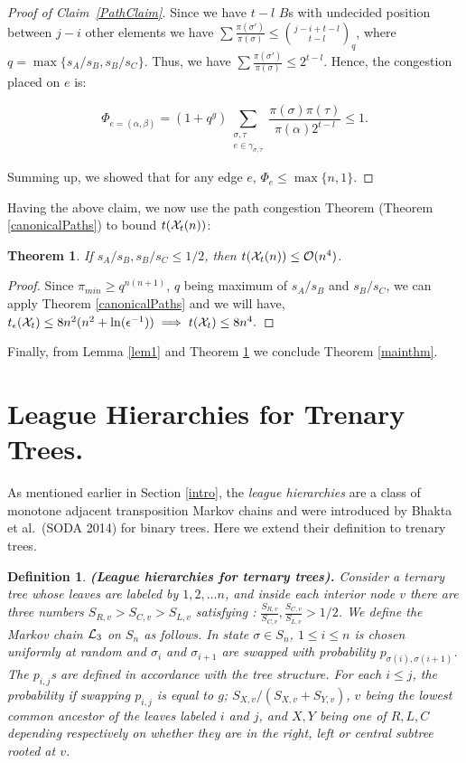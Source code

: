 \documentclass[10 pt]{article}
\newcommand{\EX}{{\cal X}}
\newcommand{\Lc}{{\cal L}_3}
\newtheorem{defin}{Definition}[section]
\newtheorem{thm}{Theorem}[section]
\begin{document}
\begin{proof}[Proof of Claim~\ref{PathClaim}]
Since we have $t-l$ $B$s with undecided position between $j{-}i$ other elements we have $\sum \frac{\pi(\sigma')}{\pi(\sigma)} \leq {{j-i+t-l}\choose{t-l}}_q$, where $q=\max\{s_A/s_B, s_B/s_C\}$. Thus, we have $\sum \frac{\pi(\sigma')}{\pi(\sigma)}  \leq 2^{t-l} $.  Hence, the congestion placed on $e$ is:

$$
 \Phi_{e=(\alpha,\beta)}=  (1+q^g)\sum_{\substack {\sigma,\tau\\ e\in \gamma_{\sigma,\tau}}} \frac{\pi(\sigma)\pi(\tau)}{\pi(\alpha) 2^{t-l}} \leq 1.
$$

Summing up, we showed that for any edge $e$, $\Phi_{e}\leq \max \{n,1\}$.

 \end{proof}
 
Having the above claim, we now use the path congestion Theorem (Theorem \ref{canonicalPaths}) to bound $t(\EX_t(n))$:
 \begin{thm}\label{big}
If $s_A/s_B,s_B/s_C\leq 1/2$, then $t(\EX_t(n))\leq {\cal O}(n^4)$. 
\end{thm}
\begin{proof}

Since $\pi_{min}\geq q^{n(n+1)}$, $q$ being maximum of $s_A/s_B$ and $s_B/s_C$, we can  apply Theorem \ref{canonicalPaths} and we will have,
$
t_{\epsilon}({\EX}_{t})\leq 8n^2 (n^2+ \ln (\epsilon^{-1}))
\implies
t({\EX}_{t})\leq 8n^4.
$



\end{proof}


Finally, from Lemma \ref{lem1} and Theorem \ref{big} we conclude Theorem \ref{mainthm}.

\section{League Hierarchies for Trenary Trees.}\label{trees}
 
As mentioned earlier in Section \ref{intro}, the \emph{league hierarchies} are a class of monotone adjacent transposition Markov chains and
were introduced by Bhakta et al.\ (SODA 2014) \cite{Dana} for binary trees. Here we extend their definition to trenary trees. 
   
\begin{defin}\textbf{(League hierarchies for ternary trees).} \label{LeagueHiDef}
Consider a ternary tree whose leaves are labeled by $1,2,\dots n$, and inside each interior node $v$ there are three numbers
$S_{R,v}>S_{C,v}> S_{L,v}$ satisfying :
$\frac{S_{R,v}}{S_{C,v}}, \frac{S_{C,v}}{S_{L,v}}>1/2$.
We define the Markov chain $\Lc$ on $S_n$ as follows.  In state $\sigma\in S_n$, $1\leq i \leq n$ is chosen uniformly at random and
$\sigma_i$ and $\sigma_{i+1}$ are swapped with probability $p_{\sigma(i), \sigma(i+1)}$. The $p_{i,j}$s are defined in accordance with
the tree structure.  For each  $i\leq j$, the probability if swapping $p_{i,j}$ is equal to $g$; $S_{X,v}/(S_{X,v}+S_{Y,v})$, $v$
being the lowest common ancestor of the leaves labeled  $i$ and $j$, and $X,Y$ being one of $R,L,C$ depending respectively on whether
they are in the right, left or central subtree rooted at $v$.
 \end{defin}
 
\end{document}
